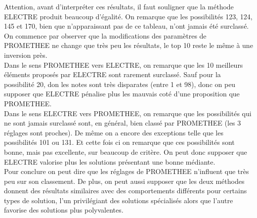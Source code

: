 \documentclass[12pt,a4paper]{article}
\begin{document}
Attention, avant d’interpréter ces résultats, il faut souligner que la méthode ELECTRE produit beaucoup d'égalité. On remarque que les possibilités 123, 124, 145 et 170, bien que n'apparaissant pas de ce tableau, n'ont jamais été surclassé.\\

On commence par observer que la modifications des paramètres de PROMETHEE ne change que très peu les résultats, le top 10 reste le même à une inversion près.\\

Dans le sens PROMETHEE vers ELECTRE, on remarque que les 10 meilleurs éléments proposés par ELECTRE sont rarement surclassé. Sauf pour la possibilité 20, don les notes sont très disparates (entre 1 et 98), donc on peu supposer que ELECTRE pénalise plus les mauvais coté d'une proposition que PROMETHEE.\\

Dans le sens ELECTRE vers PROMETHEE, on remarque que les possibilités qui ne sont jamais surclassé sont, en général, bien classé par PROMETHEE (les 3 réglages sont proches). De même on a encore des exceptions telle que les possibilités 101 ou 131. Et cette fois ci on remarque que ces possibilités sont bonne, mais pas excellente, sur beaucoup de critère. On peut donc supposer que ELECTRE valorise plus les solutions présentant une bonne médiante.\\

Pour conclure on peut dire que les réglages de PROMETHEE n'influent que très peu sur son classement. De plus, on peut aussi supposer que les deux méthodes donnent des résultats similaires avec des comportements différents pour certains types de solution, l'un privilégiant des solutions spécialisés alors que l'autre favorise des solutions plus polyvalentes.
\end{document}
